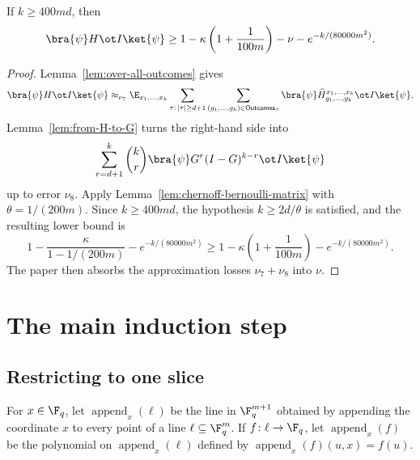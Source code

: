 \begin{corollary}\label{cor:ld-pasting-N-completeness}
	\leanok
	If $k \ge 400md$, then
	\[
		\bra{\psi} H \ot I \ket{\psi}
		\ge
		1 - \kappa\left(1+\frac{1}{100m}\right) - \nu - e^{-k/(80000m^2)}.
	\]
\end{corollary}
\begin{proof}
	\leanok
	Lemma~\ref{lem:over-all-outcomes} gives
	\[
		\bra{\psi} H \ot I \ket{\psi}
		\approx_{\nu_7}
		\E_{x_1,\dots,x_k} \sum_{\tau:\,|\tau|\ge d+1} \sum_{(g_1,\dots,g_k)\in \mathsf{Outcomes}_\tau}
		\bra{\psi} \widehat H_{g_1,\dots,g_k}^{x_1,\dots,x_k} \ot I \ket{\psi}.
	\]
	Lemma~\ref{lem:from-H-to-G} turns the right-hand side into
	\[
		\sum_{r=d+1}^k \binom{k}{r} \bra{\psi} G^r(I-G)^{k-r} \ot I \ket{\psi}
	\]
	up to error $\nu_8$. Apply Lemma~\ref{lem:chernoff-bernoulli-matrix} with $\theta = 1/(200m)$. Since $k\ge 400md$, the hypothesis $k \ge 2d/\theta$ is satisfied, and the resulting lower bound is
	\[
		1 - \frac{\kappa}{1-1/(200m)} - e^{-k/(80000m^2)}
		\ge
		1 - \kappa\left(1+\frac{1}{100m}\right) - e^{-k/(80000m^2)}.
	\]
	The paper then absorbs the approximation losses $\nu_7+\nu_8$ into $\nu$.
\end{proof}


\chapter{The main induction step}
\label{chap:induction}
\label{sec:induction}

\section{Restricting to one slice}

\begin{definition}\label{def:append-x}
	\leanok
  For $x \in \F_q$, let $\operatorname{append}_x(\ell)$ be the line in $\F_q^{m+1}$ obtained by appending the coordinate $x$ to every point of a line $\ell \subseteq \F_q^m$. If $f \colon \ell \to \F_q$, let $\operatorname{append}_x(f)$ be the polynomial on $\operatorname{append}_x(\ell)$ defined by $\operatorname{append}_x(f)(u,x)=f(u)$.
\end{definition}

